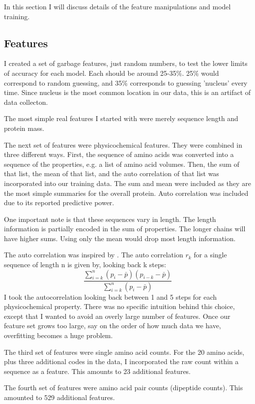 \documentclass{bioinfo}
\begin{document}
In this section I will discuss details of the feature manipulations and model training.

\subsection{Features}

I created a set of garbage features, just random numbers, to test the lower limits of accuracy for each model.
Each should be around 25-35\%. 25\% would correspond to random guessing, and 35\% corresponds to guessing 'nucleus' every time.
Since nucleus is the most common location in our data, this is an artifact of data collecton.

The most simple real features I started with were merely sequence length and protein mass.

The next set of features were physicochemical features.
They were combined in three different ways.
First, the sequence of amino acids was converted into a sequence of the properties, e.g. a list of amino acid volumes.
Then, the sum of that list, the mean of that list, and the auto correlation of that list was incorporated into our training data.
The sum and mean were included as they are the most simple summaries for the overall protein. 
Auto correlation was included due to its reported predictive power.

One important note is that these sequences vary in length.
The length information is partially encoded in the sum of properties.
The longer chains will have higher sums.
Using only the mean would drop most length information.

The auto correlation was inspired by \cite{gao_prediction_2005}.
The auto correlation $r_k$ for a single sequence of length n is given by, looking back k steps:
\[  \frac{\sum_{i=k}^n(p_i - \bar{p})(p_{i-k} - \bar{p})}{ \sum_{i=k}^n(p_i - \bar{p}) } \]
I took the autocorrelation looking back between 1 and 5 steps for each physicochemical property.
There was no specific intuition behind this choice, except that I wanted to avoid an overly large number of features.
Once our feature set grows too large, say on the order of how much data we have, overfitting becomes a huge problem.

The third set of features were single amino acid counts.
For the 20 amino acids, plus three additional codes in the data, I incorporated the raw count within a sequence as a feature.
This amounts to 23 additional features.

The fourth set of features were amino acid pair counts (dipeptide counts).
This amounted to 529 additional features.
\end{document}
